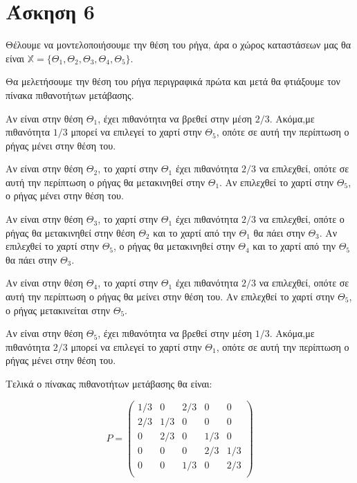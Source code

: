 \documentclass[11pt,a4paper]{article}
\begin{document}
\section*{Άσκηση 6}

Θέλουμε να μοντελοποιήσουμε την θέση του ρήγα, άρα ο χώρος καταστάσεων μας θα είναι $\mathbb{X} = \{Θ_1, Θ_2, Θ_3, Θ_4, Θ_5\}$.

Θα μελετήσουμε την θέση του ρήγα περιγραφικά πρώτα και μετά θα φτιάξουμε τον πίνακα πιθανοτήτων μετάβασης.

Αν είναι στην θέση $Θ_1$, έχει πιθανότητα να βρεθεί στην μέση $2/3$. Ακόμα,με πιθανότητα $1/3$ μπορεί να επιλεγεί το χαρτί στην $Θ_5$, οπότε σε αυτή την περίπτωση ο ρήγας μένει στην θέση του.

Αν είναι στην θέση $Θ_2$, το χαρτί στην $Θ_1$ έχει πιθανότητα $2/3$ να επιλεχθεί, οπότε σε αυτή την περίπτωση ο ρήγας θα μετακινηθεί στην $Θ_1$. Αν επιλεχθεί το χαρτί στην $Θ_5$, ο ρήγας μένει στην θέση του.

Αν είναι στην θέση $Θ_3$, το χαρτί στην $Θ_1$ έχει πιθανότητα $2/3$ να επιλεχθεί, οπότε ο ρήγας θα μετακινηθεί στην θέση $Θ_2$ και το χαρτί από την $Θ_1$ θα πάει στην $Θ_3$.  Αν επιλεχθεί το χαρτί στην $Θ_5$, ο ρήγας θα μετακινηθεί στην $Θ_4$ και το χαρτί από την $Θ_5$ θα πάει στην $Θ_3$.

Αν είναι στην θέση $Θ_4$, το χαρτί στην $Θ_1$ έχει πιθανότητα $2/3$ να επιλεχθεί, οπότε σε αυτή την περίπτωση ο ρήγας θα μείνει στην θέση του. Αν επιλεχθεί το χαρτί στην $Θ_5$, ο ρήγας μετακινείται στην $Θ_5$.

Αν είναι στην θέση $Θ_5$, έχει πιθανότητα να βρεθεί στην μέση $1/3$. Ακόμα,με πιθανότητα $2/3$ μπορεί να επιλεγεί το χαρτί στην $Θ_1$, οπότε σε αυτή την περίπτωση ο ρήγας μένει στην θέση του.

Τελικά ο πίνακας πιθανοτήτων μετάβασης θα είναι:

\begin{equation*}
    P =
    \begin{pmatrix}
        1/3 & 0   & 2/3 & 0   & 0   \\
        2/3 & 1/3 & 0   & 0   & 0   \\
        0   & 2/3 & 0   & 1/3 & 0   \\
        0   & 0   & 0   & 2/3 & 1/3 \\
        0   & 0   & 1/3 & 0   & 2/3 \\
    \end{pmatrix}
\end{equation*}
\end{document}
